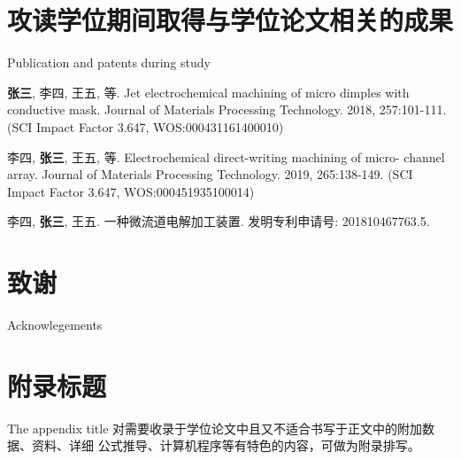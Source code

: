 \documentclass[
  type=master
]{gdutthesis}
\begin{document}
\zhlipsum[1]

\nocite{*}%
\printbibliography

\chapter{攻读学位期间取得与学位论文相关的成果}{Publication and patents during study}


\begin{results}
  \item \textbf{张三}, 李四, 王五, 等. Jet electrochemical machining of micro dimples with conductive mask.
  Journal of Materials Processing Technology. 2018, 257:101-111. (SCI Impact Factor 3.647,
  WOS:000431161400010)
  \item 李四, \textbf{张三}, 王五, 等. Electrochemical direct-writing machining of micro- channel array.
  Journal of Materials Processing Technology. 2019, 265:138-149. (SCI Impact Factor 3.647,
  WOS:000451935100014)
\end{results}


\begin{results}
  \item 李四, \textbf{张三}, 王五. 一种微流道电解加工装置. 发明专利申请号: 201810467763.5.
\end{results}

\gdutstatement

\chapter{致谢}{Acknowlegements}
\zhlipsum[1]

\gdutappendix

\chapter{附录标题}{The appendix title}
对需要收录于学位论文中且又不适合书写于正文中的附加数据、资料、详细
公式推导、计算机程序等有特色的内容，可做为附录排写。
\end{document}
